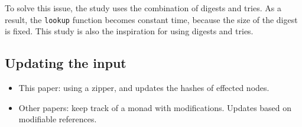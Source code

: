To solve this issue, the study  uses the combination of digests and tries. As a result, the \texttt{lookup} function becomes constant time, because the size of the digest is fixed. This study is also the inspiration for using digests and tries.

\subsection{Updating the input}
\begin{itemize}
  \item This paper: using a zipper, and updates the hashes of effected nodes.
  \item Other papers: keep track of a monad with modifications. Updates based on modifiable references.
\end{itemize}


